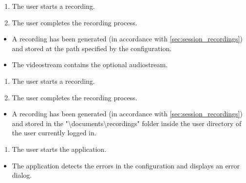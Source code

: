 \begin{tests}
    {\begin{enumerate}
        \item The \gls{user} starts a recording.
        \item The \gls{user} completes the recording process.
    \end{enumerate}}
    {\begin{itemize}
        \item A recording has been generated (in accordance with \ref{sec:session_recordings}) and stored at the path specified by the configuration.
        \item The \gls{videostream} contains the optional audiostream.
    \end{itemize}}

    {\begin{enumerate}
        \item The \gls{user} starts a recording.
        \item The \gls{user} completes the recording process.
    \end{enumerate}}
    {\begin{itemize}
        \item A recording has been generated (in accordance with \ref{sec:session_recordings}) and stored in the "\textbackslash documents\textbackslash recordings" folder inside the \gls{user} directory of the \gls{user} currently logged in.
    \end{itemize}}
\newpage
    {\begin{enumerate}
        \item The \gls{user} starts the application.
    \end{enumerate}}
    {\begin{itemize}
        \item The application detects the errors in the configuration and displays an error dialog.
    \end{itemize}}


\end{tests}
